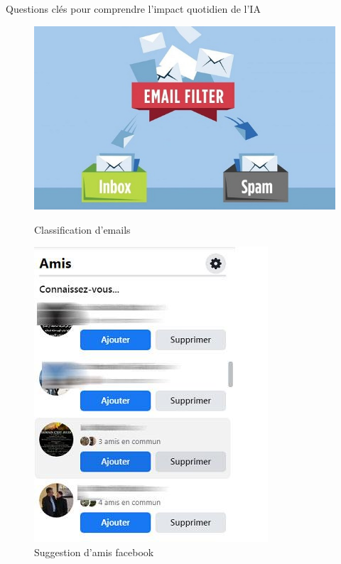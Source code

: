 \documentclass{beamer}
\begin{document}
\begin{frame}{Questions clés pour comprendre l'impact quotidien de l'IA}
\begin{figure}
	\begin{minipage}{0.48\textwidth}
	\centering
	\includegraphics[width=\linewidth]{spam-1.jpg}
	\caption{Classification d'emails}
\end{minipage}\hfill
\begin{minipage}{0.44\textwidth}
	\centering
	\includegraphics[width=\linewidth]{connaissez-vous-facebook.jpg}
	\caption{Suggestion d'amis facebook}
\end{minipage}
\end{figure}
\end{frame}
\end{document}
